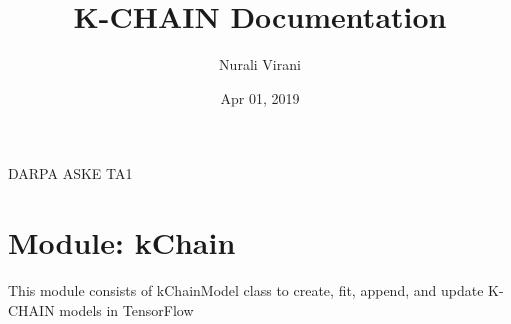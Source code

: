 \documentclass[letterpaper,10pt,english]{sphinxmanual}
\title{K-CHAIN Documentation}
\date{Apr 01, 2019}
\author{Nurali Virani}
\begin{document}
\pagestyle{empty}
\maketitle
\pagestyle{plain}
\sphinxtableofcontents
\pagestyle{normal}
\label{\detokenize{index::doc}}


DARPA ASKE TA1


\chapter{Module: kChain}
\label{\detokenize{index:module-kChain}}\label{\detokenize{index:module-kchain}}
This module consists of kChainModel class to create, fit, append, and update
K-CHAIN models in TensorFlow
\end{document}
